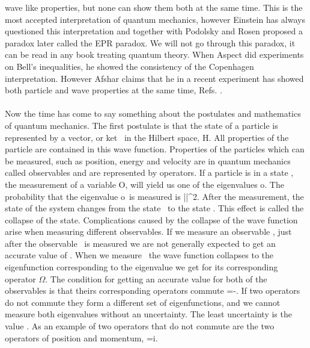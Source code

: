 wave like properties, but none can show them both at the same time.  This is
the most accepted interpretation of quantum mechanics, however Einstein has
always questioned this interpretation and together with Podolsky and Rosen
proposed a paradox later called the EPR paradox. We will not go through this
paradox, it can be read in any book treating quantum theory. When Aspect did
experiments on Bell's inequalities, he showed the consistency of the Copenhagen interpretation. However Afshar claims that he
in a recent experiment has showed both particle and wave properties at the same time,
Refs. \cite{afshar-2005-5866,afshar-2006-810}.\\ 
\\
Now the time has come to say something about the postulates and mathematics of
quantum mechanics.  The first postulate is that the state of a particle is
represented by a vector, or ket \sd{}\sd\, in the Hilbert space, \sd
\mathcal H\sd. All properties of the particle are contained in this wave
function. Properties of the particles which can be measured, such as position,
energy and velocity are in quantum mechanics called observables and are
represented by operators.  If a particle is in a state \sd \ket{\Psi}\sd, the
measurement of a variable \sd O\sd, will yield us one of the eigenvalues
\sd o\sd. The probability that the eigenvalue \sd o\sd \, is measured is
\sd||^2\sd. After the measurement, the state of the system
changes from the state \sd \ket{\Psi}\sd\, to the state \sd{}\sd. This
effect is called the collapse of the state.  Complications caused by the
collapse of the wave function arise when measuring different observables. If we
measure an observable \sd \lambda\sd, just after the observable \sd \omega\sd\,
is measured we are not generally expected to get an accurate value of \sd \lambda\sd. When
we measure \sd \omega\sd\, the wave function collapses to the eigenfunction corresponding to the 
eigenvalue we get for its corresponding operator $\Omega$. The condition for getting an accurate value for both of the observables is that theirs corresponding operators commute
\beq
[\Omega,\Lambda]=\Omega\Lambda-\Lambda{}.
\eeq  
If two operators do not commute they form a different set of eigenfunctions, and we cannot measure both 
eigenvalues without
an uncertainty. The least uncertainty is the value \sd[\Omega,\Lambda] \sd. As an example of two operators
that do not commute are the two
operators of position and momentum, \sd[X,P]=i\hbar\sd.\\ 
\\
